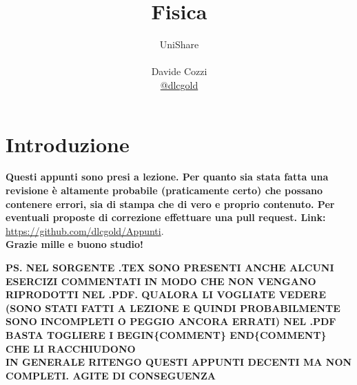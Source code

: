 \documentclass[a4paper,12pt, oneside]{book}
\title{Fisica}
\author{UniShare\\\\Davide Cozzi\\\href{https://t.me/dlcgold}{@dlcgold}}
\date{}
\begin{document}
\maketitle


\newtheorem{teorema}{Teorema}
\newtheorem{definizione}{Definizione}
\newtheorem{esempio}{Esempio}
\newtheorem{corollario}{Corollario}
\newtheorem{lemma}{Lemma}
\newtheorem{osservazione}{Osservazione}
\newtheorem{nota}{Nota}
\newtheorem{esercizio}{Esercizio}
\tableofcontents

\renewcommand{\chaptermark}[1]{%
	\markboth{\chaptername
		\ \thechapter.\ #1}{}}
\renewcommand{\sectionmark}[1]{\markright{\thesection.\ #1}}

\chapter{Introduzione}
\textbf{Questi appunti sono presi a lezione. Per quanto sia stata fatta una revisione è altamente probabile (praticamente certo) che possano contenere errori, sia di stampa che di vero e proprio contenuto. Per eventuali proposte di correzione effettuare una pull request. Link: } \url{https://github.com/dlcgold/Appunti}.\\
\textbf{Grazie mille e buono studio!}

\textbf{PS. NEL SORGENTE .TEX SONO PRESENTI ANCHE ALCUNI ESERCIZI COMMENTATI IN MODO CHE NON VENGANO RIPRODOTTI NEL .PDF. QUALORA LI VOGLIATE VEDERE (SONO STATI FATTI A LEZIONE E QUINDI PROBABILMENTE SONO INCOMPLETI O PEGGIO ANCORA ERRATI) NEL .PDF BASTA TOGLIERE I BEGIN\{COMMENT\} END\{COMMENT\} CHE LI RACCHIUDONO}\\
\textbf{IN GENERALE RITENGO QUESTI APPUNTI DECENTI MA NON COMPLETI. AGITE DI CONSEGUENZA}
\end{document}
